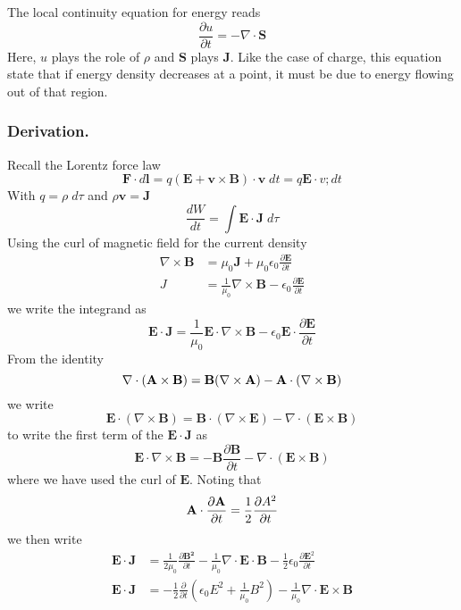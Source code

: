 \documentclass[../../../main.tex]{subfiles}
\begin{document}
The local continuity equation for energy reads 
\begin{equation*}
    \frac{\partial u}{\partial t}=-\nabla\cdot\mathbf{S}
\end{equation*}
Here, $u$ plays the role of $\rho$ and $\mathbf{S}$ plays $\mathbf{J}$.
Like the case of charge, this equation state that if energy density decreases at a point, it must be due to energy flowing out of that region.
\subsubsection*{Derivation.}
Recall the Lorentz force law 
\begin{equation*}
    \mathbf{F}\cdot d\mathbf{l}=q(\mathbf{E}+\mathbf{v}\times \mathbf{B})\cdot\mathbf{v}\;dt=q\mathbf{E}\cdot v;dt
\end{equation*}
With $q=\rho\;d\tau$ and $\rho\mathbf{v}=\mathbf{J}$
\begin{equation*}
    \frac{dW}{dt}=\int \mathbf{E}\cdot\mathbf{J}\;d\tau
\end{equation*}
Using the curl of magnetic field for the current density 
\begin{align*}
    \nabla\times\mathbf{B}&=\mu_0\mathbf{J}+\mu_0\epsilon_0\frac{\partial \mathbf{E}}{\partial t}\\
    J&=\frac{1}{\mu_0}\nabla\times \mathbf{B}-\epsilon_0\frac{\partial \mathbf{E}}{\partial t}
\end{align*}
we write the integrand as 
\begin{equation*}
    \mathbf{E}\cdot\mathbf{J}=\frac{1}{\mu_0}\mathbf{E}\cdot\nabla\times\mathbf{B}-\epsilon_0\mathbf{E}\cdot\frac{\partial \mathbf{E}}{\partial t}
\end{equation*}
From the identity 
\begin{equation*}
    \nabla\cdot(\mathbf{A}\times\mathbf{B})=\mathbf{B}(\nabla\times\mathbf{A})-\mathbf{A}\cdot(\nabla\times\mathbf{B})
\end{equation*}
we write 
\begin{equation*}
    \mathbf{E}\cdot(\nabla\times\mathbf{B})=\mathbf{B}\cdot(\nabla\times\mathbf{E})-\nabla\cdot(\mathbf{E}\times\mathbf{B})
\end{equation*}
to write the first term of the $\mathbf{E}\cdot\mathbf{J}$ as 
\begin{equation*}
    \mathbf{E}\cdot\nabla\times\mathbf{B}=-\mathbf{B}\frac{\partial \mathbf{B}}{\partial t}-\nabla\cdot(\mathbf{E}\times \mathbf{B})
\end{equation*}
where we have used the curl of $\mathbf{E}$. 
Noting that 
\begin{equation*}
    \mathbf{A}\cdot\frac{\partial\mathbf{A}}{\partial t}=\frac{1}{2}\frac{\partial A^2}{\partial t}
\end{equation*}
we then write
\begin{align*}
    \mathbf{E}\cdot\mathbf{J}&=\frac{1}{2\mu_0}\frac{\partial \mathbf{B^2}}{\partial t} -\frac{1}{\mu_0}\nabla\cdot\mathbf{E}\cdot\mathbf{B} -\frac{1}{2}\epsilon_0\frac{\partial \mathbf{E}^2}{\partial t}\\
    \mathbf{E}\cdot\mathbf{J}&=-\frac{1}{2}\frac{\partial}{\partial t}\left(\epsilon_0E^2+\frac{1}{\mu_0}B^2\right)-\frac{1}{\mu_0}\nabla\cdot\mathbf{E}\times\mathbf{B}
\end{align*} 
\end{document}
